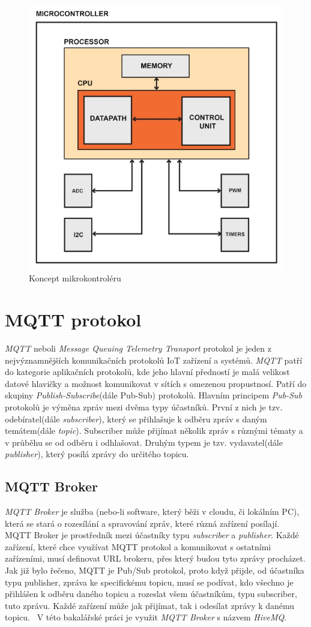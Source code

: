 \begin{figure}[hbt]
  \centering
  \includegraphics[width=.6 \linewidth]{obrazky-figures/mcu.jpeg}
  \caption{
    Koncept mikrokontroléru
  }
  \label{figure:mcu}
\end{figure}

\newpage

\section{MQTT protokol}
\label{terminy:mqtt}

\emph{MQTT} neboli \emph{Message Queuing Telemetry Transport} protokol je jeden z nejvýznamnějších komunikačních protokolů IoT zařízení a systémů.
\emph{MQTT} patří do kategorie aplikačních protokolů, kde jeho hlavní předností je malá velikost datové hlavičky a možnost komunikovat v sítích s omezenou propustnosí.
Patří do skupiny \emph{Publish-Subscribe}(dále Pub-Sub) protokolů. Hlavním principem \emph{Pub-Sub} protokolů je výměna zpráv mezi dvěma typy účastníků. První z nich je tzv. odebíratel(dále \emph{subscriber}),
který se přihlašuje k odběru zpráv s daným temátem(dále \emph{topic}).
Subscriber může přijímat několik zpráv s různými tématy a v průběhu se od odběru i odhlašovat. Druhým typem je tzv. vydavatel(dále \emph{publisher}), který posílá zprávy do určitého
topicu.~\cite{mqtt:info}

\subsection*{MQTT Broker}
\emph{MQTT Broker} je služba (nebo-li software, který běži v cloudu, či lokálním PC), která se stará o rozesílání a spravování zpráv, které různá zařízení posílají. MQTT Broker je prostředník mezi účastníky typu \emph{subscriber} a \emph{publisher}.
Každé zařízení, které chce využívat MQTT protokol a komunikovat s ostatními zařízeními, musí definovat URL brokeru, přes který budou tyto zprávy procházet.
Jak již bylo řečeno, MQTT je Pub/Sub protokol, proto když přijde, od účastníka typu publisher, zpráva ke specifickému topicu, musí se podívat, kdo všechno je přihlášen k odběru daného topicu a rozeslat všem účastníkům, typu subscriber, tuto zprávu.
Každé zařízení může jak přijímat, tak i odesílat zprávy k danému topicu.~\cite{wiki:mqtt_broker} V této bakalářské práci je využit \emph{MQTT Broker} s názvem \emph{HiveMQ}.

